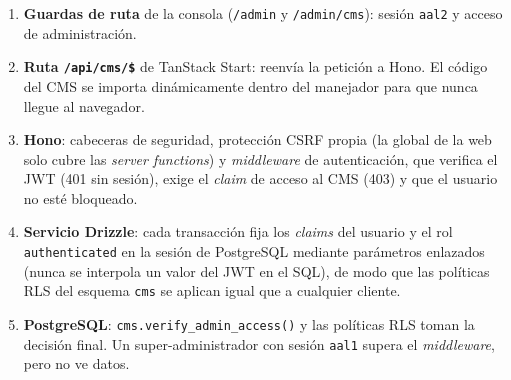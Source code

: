 \begin{enumerate}
  \item \textbf{Guardas de ruta} de la consola (\texttt{/admin} y
        \texttt{/admin/cms}): sesión \texttt{aal2} y acceso de administración.
  \item \textbf{Ruta \texttt{/api/cms/\$}} de TanStack Start: reenvía la
        petición a Hono. El código del CMS se importa dinámicamente dentro
        del manejador para que nunca llegue al navegador.
  \item \textbf{Hono}: cabeceras de seguridad, protección CSRF propia (la
        global de la web solo cubre las \textit{server functions}) y
        \textit{middleware} de autenticación, que verifica el JWT (401 sin
        sesión), exige el \textit{claim} de acceso al CMS (403) y que el
        usuario no esté bloqueado.
  \item \textbf{Servicio Drizzle}: cada transacción fija los
        \textit{claims} del usuario y el rol \texttt{authenticated} en la
        sesión de PostgreSQL mediante parámetros enlazados (nunca se
        interpola un valor del JWT en el SQL), de modo que las políticas RLS
        del esquema \texttt{cms} se aplican igual que a cualquier cliente.
  \item \textbf{PostgreSQL}: \texttt{cms.verify\_admin\_access()} y las
        políticas RLS toman la decisión final. Un super-administrador con
        sesión \texttt{aal1} supera el \textit{middleware}, pero no ve datos.
\end{enumerate}

